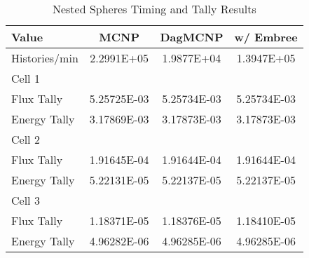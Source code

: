 \documentclass{anstrans}
\begin{document}
\begin{table}[H]

  \begin{center}
    \caption{Nested Spheres Timing and Tally Results}
    
    \begin{tabular}{lccc}
      \toprule
      Value & MCNP & DagMCNP & w/ Embree \\
      \toprule
      Histories/min & 2.2991E+05 & 1.9877E+04 & 1.3947E+05 \\
      \hline
      Cell 1 & & & \\
      Flux Tally & 5.25725E-03 & 5.25734E-03 & 5.25734E-03 \\
      Energy Tally & 3.17869E-03 &  3.17873E-03 &  3.17873E-03 \\
      \hline
      Cell 2 & & & \\
      Flux Tally & 1.91645E-04 & 1.91644E-04 & 1.91644E-04 \\
      Energy Tally & 5.22131E-05 & 5.22137E-05 & 5.22137E-05 \\
      \hline
      Cell 3 & & & \\
      Flux Tally & 1.18371E-05 & 1.18376E-05 & 1.18410E-05 \\
      Energy Tally & 4.96282E-06 & 4.96285E-06 & 4.96285E-06 \\
      \bottomrule
                        
    \end{tabular}


  \end{center}

\end{table}
\end{document}
